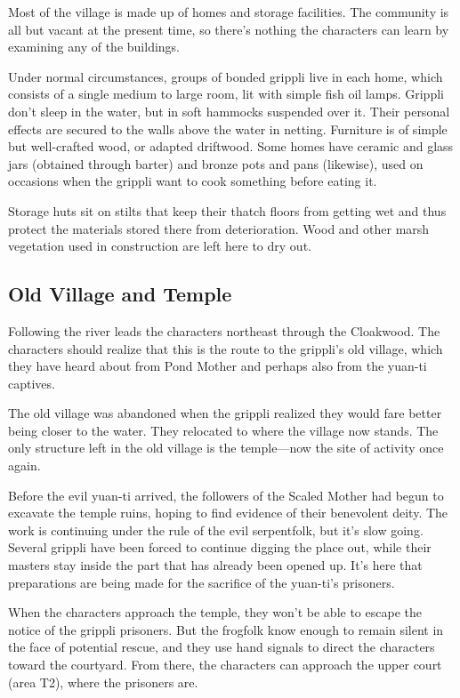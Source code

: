 \documentclass[10pt,a4paper,twoside,bg=print,twocolumn,openany,nodeprecatedcode]{dndbook}
\begin{document}
Most of the village is made up of homes and storage facilities. The community is all but vacant at the present time, so there's nothing the characters can learn by examining any of the buildings.

Under normal circumstances, groups of bonded grippli live in each home, which consists of a single medium to large room, lit with simple fish oil lamps. Grippli don't sleep in the water, but in soft hammocks suspended over it. Their personal effects are secured to the walls above the water in netting. Furniture is of simple but well-crafted wood, or adapted driftwood. Some homes have ceramic and glass jars (obtained through barter) and bronze pots and pans (likewise), used on occasions when the grippli want to cook something before eating it.

Storage huts sit on stilts that keep their thatch floors from getting wet and thus protect the materials stored there from deterioration. Wood and other marsh vegetation used in construction are left here to dry out.

\subsection{Old Village and Temple}
Following the river leads the characters northeast through the Cloakwood. The characters should realize that this is the route to the grippli's old village, which they have heard about from Pond Mother and perhaps also from the yuan-ti captives.

The old village was abandoned when the grippli realized they would fare better being closer to the water. They relocated to where the village now stands. The only structure left in the old village is the temple—now the site of activity once again.

Before the evil yuan-ti arrived, the followers of the Scaled Mother had begun to excavate the temple ruins, hoping to find evidence of their benevolent deity. The work is continuing under the rule of the evil serpentfolk, but it's slow going. Several grippli have been forced to continue digging the place out, while their masters stay inside the part that has already been opened up. It's here that preparations are being made for the sacrifice of the yuan-ti's prisoners.

When the characters approach the temple, they won't be able to escape the notice of the grippli prisoners. But the frogfolk know enough to remain silent in the face of potential rescue, and they use hand signals to direct the characters toward the courtyard. From there, the characters can approach the upper court (area T2), where the prisoners are.
\end{document}
